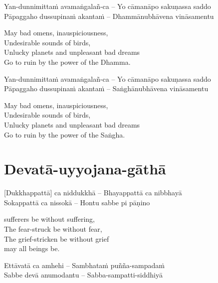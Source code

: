 Yan-dunnimittaṁ avamaṅgalañ-ca – Yo cāmanāpo sakuṇassa saddo\\
Pāpaggaho dussupinaṁ akantaṁ – Dhammānubhāvena vināsamentu

\begin{english-verses}
  May bad omens, inauspiciousness,\\
  Undesirable sounds of birds,\\
  Unlucky planets and unpleasant bad dreams\\
  Go to ruin by the power of the Dhamma.
\end{english-verses}

Yan-dunnimittaṁ avamaṅgalañ-ca – Yo cāmanāpo sakuṇassa saddo\\
Pāpaggaho dussupinaṁ akantaṁ – Saṅghānubhāvena vināsamentu

\begin{english-verses}
  May bad omens, inauspiciousness,\\
  Undesirable sounds of birds,\\
  Unlucky planets and unpleasant bad dreams\\
  Go to ruin by the power of the Saṅgha.
\end{english-verses}

\suttaRef{[Trad]}

\section{Devatā-uyyojana-gāthā}
\label{devata-uyyojana-gatha}

\vspace{-0.6em}

[Dukkhappattā] ca niddukkhā – Bhayappattā ca nibbhayā\\
Sokappattā ca nissokā – Hontu sabbe pi pāṇino

\begin{english-verses}
  [May] sufferers be without suffering,\\
  The fear-struck be without fear,\\
  The grief-stricken be without grief\\\relax
  [Thus] may all beings be.
\end{english-verses}

Ettāvatā ca amhehi – Sambhataṁ puñña-sampadaṁ\\
Sabbe devā anumodantu\hyperlink{endnote125-appendix}{\hypertarget{endnote125-body}{}}
– Sabba-sampatti-siddhiyā

